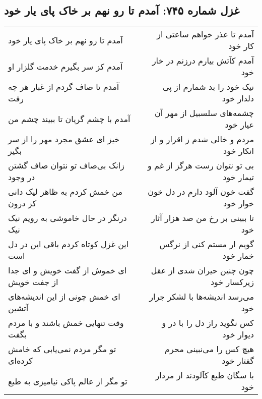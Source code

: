 \begin{center}
\section*{غزل شماره ۷۴۵: آمدم تا رو نهم بر خاک پای یار خود}
\label{sec:0745}
\begin{longtable}{l p{0.5cm} r}
آمدم تا رو نهم بر خاک پای یار خود
&&
آمدم تا عذر خواهم ساعتی از کار خود
\\
آمدم کز سر بگیرم خدمت گلزار او
&&
آمدم کآتش بیارم درزنم در خار خود
\\
آمدم تا صاف گردم از غبار هر چه رفت
&&
نیک خود را بد شمارم از پی دلدار خود
\\
آمدم با چشم گریان تا ببیند چشم من
&&
چشمه‌های سلسبیل از مهر آن عیار خود
\\
خیز ای عشق مجرد مهر را از سر بگیر
&&
مردم و خالی شدم ز اقرار و از انکار خود
\\
زانک بی‌صاف تو نتوان صاف گشتن در وجود
&&
بی تو نتوان رست هرگز از غم و تیمار خود
\\
من خمش کردم به ظاهر لیک دانی کز درون
&&
گفت خون آلود دارم در دل خون خوار خود
\\
درنگر در حال خاموشی به رویم نیک نیک
&&
تا ببینی بر رخ من صد هزار آثار خود
\\
این غزل کوتاه کردم باقی این در دل است
&&
گویم ار مستم کنی از نرگس خمار خود
\\
ای خموش از گفت خویش و ای جدا از جفت خویش
&&
چون چنین حیران شدی از عقل زیرکسار خود
\\
ای خمش چونی از این اندیشه‌های آتشین
&&
می‌رسد اندیشه‌ها با لشکر جرار خود
\\
وقت تنهایی خمش باشند و با مردم بگفت
&&
کس نگوید راز دل را با در و دیوار خود
\\
تو مگر مردم نمی‌یابی که خامش کرده‌ای
&&
هیچ کس را می‌نبینی محرم گفتار خود
\\
تو مگر از عالم پاکی نیامیزی به طبع
&&
با سگان طبع کآلودند از مردار خود
\\
\end{longtable}
\end{center}
